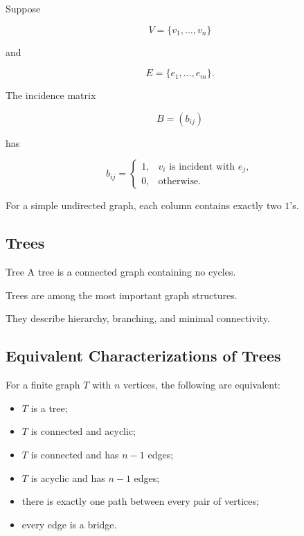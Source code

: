 Suppose

\[
V=\{v_1,\ldots,v_n\}
\]

and

\[
E=\{e_1,\ldots,e_m\}.
\]

The incidence matrix

\[
B=(b_{ij})
\]

has

\[
\boxed{
b_{ij}
=
\begin{cases}
1,&v_i\text{ is incident with }e_j,\\
0,&\text{otherwise}.
\end{cases}
}
\]

For a simple undirected graph, each column contains exactly two \(1\)'s.

\subsection{Trees}
\label{subsec:trees}

\begin{definitionbox}{Tree}
A tree is a connected graph containing no cycles.
\end{definitionbox}

Trees are among the most important graph structures.

They describe hierarchy, branching, and minimal connectivity.

\subsection{Equivalent Characterizations of Trees}
\label{subsec:tree-characterizations}

For a finite graph \(T\) with \(n\) vertices, the following are
equivalent:

\begin{itemize}
    \item \(T\) is a tree;
    \item \(T\) is connected and acyclic;
    \item \(T\) is connected and has \(n-1\) edges;
    \item \(T\) is acyclic and has \(n-1\) edges;
    \item there is exactly one path between every pair of vertices;
    \item every edge is a bridge.
\end{itemize}

